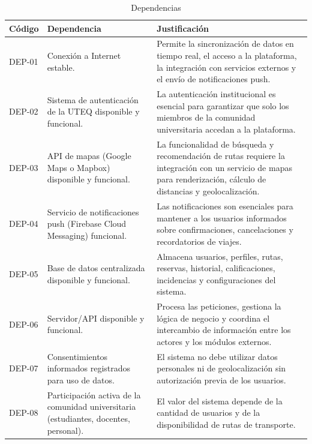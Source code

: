 \documentclass[11pt,a4paper]{article}
\begin{document}
\begin{table}[h]
    \centering
    \caption{Dependencias}
    \label{tab:dependencias}
    \vspace{6pt}
    \begin{tabularx}{\textwidth}{|l|X|X|}
    \hline
    \textbf{Código} & \textbf{Dependencia} & \textbf{Justificación} \\
    \hline
    DEP-01 & Conexión a Internet estable. & Permite la sincronización de datos en tiempo real, el acceso a la plataforma, la integración con servicios externos y el envío de notificaciones push. \\
    \hline
    DEP-02 & Sistema de autenticación de la UTEQ disponible y funcional. & La autenticación institucional es esencial para garantizar que solo los miembros de la comunidad universitaria accedan a la plataforma. \\
    \hline
    DEP-03 & API de mapas (Google Maps o Mapbox) disponible y funcional. & La funcionalidad de búsqueda y recomendación de rutas requiere la integración con un servicio de mapas para renderización, cálculo de distancias y geolocalización. \\
    \hline
    DEP-04 & Servicio de notificaciones push (Firebase Cloud Messaging) funcional. & Las notificaciones son esenciales para mantener a los usuarios informados sobre confirmaciones, cancelaciones y recordatorios de viajes. \\
    \hline
    DEP-05 & Base de datos centralizada disponible y funcional. & Almacena usuarios, perfiles, rutas, reservas, historial, calificaciones, incidencias y configuraciones del sistema. \\
    \hline
    DEP-06 & Servidor/API disponible y funcional. & Procesa las peticiones, gestiona la lógica de negocio y coordina el intercambio de información entre los actores y los módulos externos. \\
    \hline
    DEP-07 & Consentimientos informados registrados para uso de datos. & El sistema no debe utilizar datos personales ni de geolocalización sin autorización previa de los usuarios. \\
    \hline
    DEP-08 & Participación activa de la comunidad universitaria (estudiantes, docentes, personal). & El valor del sistema depende de la cantidad de usuarios y de la disponibilidad de rutas de transporte. \\
    \hline
    \end{tabularx}
\end{table}
\end{document}
